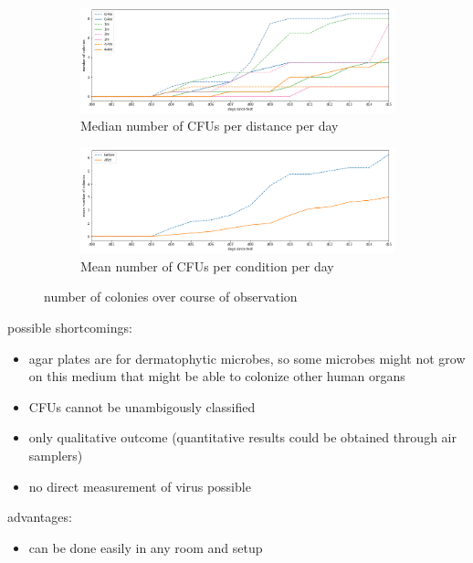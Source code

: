 \documentclass[hyperref]{labbook}
\begin{document}
\begin{figure}[H]
\begin{subfigure}{\textwidth}
\includegraphics[scale=0.5]{CFU_per_day}
\caption{Median number of CFUs per distance per day}
\end{subfigure}
\begin{subfigure}{\textwidth}
\includegraphics[scale=0.5]{mean_CFU_per_day}
\caption{Mean number of CFUs per condition per day}
\end{subfigure}
\caption{number of colonies over course of observation}
\end{figure}

possible shortcomings:
\begin{itemize}
\item agar plates are for dermatophytic microbes, so some microbes might not grow on this medium that might be able to colonize other human organs
\item CFUs cannot be unambigously classified
\item only qualitative outcome (quantitative results could be obtained through air samplers)
\item no direct measurement of virus possible
\end{itemize}
advantages:
\begin{itemize}
\item can be done easily in any room and setup
\end{itemize}
\end{document}
